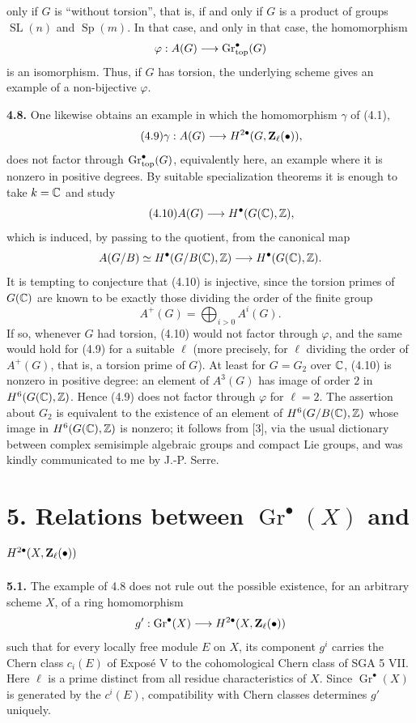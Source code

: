 only if $G$ is ``without torsion'', that is, if and only if $G$ is a
product of groups $\operatorname{SL}(n)$ and $\operatorname{Sp}(m)$. In
that case, and only in that case, the homomorphism
\[
 \varphi:A(G)\longrightarrow\operatorname{Gr}_{\mathrm{top}}^\bullet(G)
\]
is an isomorphism. Thus, if $G$ has torsion, the underlying scheme gives an
example of a non-bijective $\varphi$.

\textbf{4.8.} One likewise obtains an example in which the homomorphism
$\gamma$ of (4.1),
\begin{equation}\tag{4.9}
 \gamma:A(G)\longrightarrow H^{2\bullet}(G,\mathbf Z_\ell(\bullet)),
\end{equation}
does not factor through $\operatorname{Gr}_{\mathrm{top}}^\bullet(G)$, equivalently here, an example
where it is nonzero in positive degrees. By suitable specialization
theorems it is enough to take $k=\mathbb C$ and study
\begin{equation}\tag{4.10}
 A(G)\longrightarrow H^\bullet(G(\mathbb C),\mathbb Z),
\end{equation}
which is induced, by passing to the quotient, from the canonical map
\[
 A(G/B)\simeq H^\bullet(G/B(\mathbb C),\mathbb Z)
   \longrightarrow H^\bullet(G(\mathbb C),\mathbb Z).
\]
It is tempting to conjecture that (4.10) is injective, since the torsion
primes of $G(\mathbb C)$ are known to be exactly those dividing the order of the
finite group
\[
 A^+(G)=\bigoplus_{i>0}A^i(G).
\]
If so, whenever $G$ had torsion, (4.10) would not factor through
$\varphi$, and the same would hold for (4.9) for a suitable $\ell$ (more
precisely, for $\ell$ dividing the order of $A^+(G)$, that is, a torsion
prime of $G$). At least for $G=G_2$ over $\mathbb C$, (4.10) is nonzero in
positive degree: an element of $A^3(G)$ has image of order $2$ in
$H^6(G(\mathbb C),\mathbb Z)$. Hence (4.9) does not factor through $\varphi$ for
$\ell=2$. The assertion about $G_2$ is equivalent to the existence of an
element of $H^6(G/B(\mathbb C),\mathbb Z)$ whose image in $H^6(G(\mathbb C),\mathbb Z)$ is nonzero;
it follows from [3], via the usual dictionary between complex semisimple
algebraic groups and compact Lie groups, and was kindly communicated to me
by J.-P. Serre.

\section*{5. Relations between $\operatorname{Gr}^\bullet(X)$ and
$H^{2\bullet}(X,\mathbf Z_\ell(\bullet))$}

\textbf{5.1.} The example of 4.8 does not rule out the possible existence,
for an arbitrary scheme $X$, of a ring homomorphism
\[
 g':\operatorname{Gr}^\bullet(X)
   \longrightarrow H^{2\bullet}(X,\mathbf Z_\ell(\bullet))
\]
such that for every locally free module $E$ on $X$, its component $g^i$
carries the Chern class $c_i(E)$ of Exposé V to the cohomological Chern
class of SGA 5 VII. Here $\ell$ is a prime distinct from all residue
characteristics of $X$. Since $\operatorname{Gr}^\bullet(X)$ is generated
by the $c^i(E)$, compatibility with Chern classes determines $g'$
uniquely.

